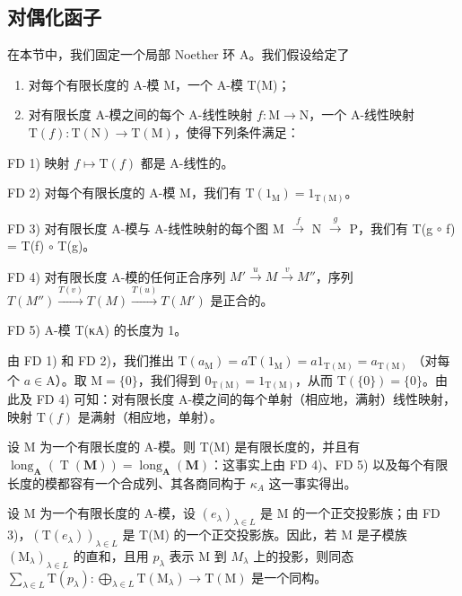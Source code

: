 \subsection{对偶化函子}

在本节中，我们固定一个局部 Noether 环 A。我们假设给定了

\begin{enumerate}
\def\labelenumi{\alph{enumi})}
\item
  对每个有限长度的 A-模 M，一个 A-模 T(M)；
\item
  对有限长度 A-模之间的每个 A-线性映射 \(f: \mathrm{M} \to \mathrm{N}\)，一个 A-线性映射 \(\mathrm{T}(f): \mathrm{T}(\mathrm{N}) \to \mathrm{T}(\mathrm{M})\)，使得下列条件满足：
\end{enumerate}

FD 1) 映射 \(f \mapsto \mathrm{T}(f)\) 都是 A-线性的。

FD 2) 对每个有限长度的 A-模 M，我们有 \(\mathrm{T}(1_{\mathrm{M}}) = 1_{\mathrm{T(M)}}\)。

FD 3) 对有限长度 A-模与 A-线性映射的每个图 M \(\xrightarrow{f}\) N \(\xrightarrow{g}\) P，我们有 T(g \(\circ\) f) = T(f) \(\circ\) T(g)。

FD 4) 对有限长度 A-模的任何正合序列 \(M' \xrightarrow{u} M \xrightarrow{v} M''\)，序列 \(T(M'') \xrightarrow{T(v)} T(M) \xrightarrow{T(u)} T(M')\) 是正合的。

FD 5) A-模 T(κA) 的长度为 1。

由 FD 1) 和 FD 2)，我们推出 \(\mathrm{T}(a_{\mathrm{M}}) = a\mathrm{T}(1_{\mathrm{M}}) = a1_{\mathrm{T(M)}} = a_{\mathrm{T(M)}}\) （对每个 \(a \in \mathrm{A}\)）。取 \(\mathrm{M} = \{0\}\)，我们得到 \(0_{\mathrm{T(M)}} = 1_{\mathrm{T(M)}}\)，从而 \(\mathrm{T}(\{0\}) = \{0\}\)。由此及 FD 4) 可知：对有限长度 A-模之间的每个单射（相应地，满射）线性映射，映射 \(\mathrm{T}(f)\) 是满射（相应地，单射）。

设 M 为一个有限长度的 A-模。则 T(M) 是有限长度的，并且有 \(\operatorname{long}_{\mathbf{A}}(\operatorname{T}(\mathbf{M})) = \operatorname{long}_{\mathbf{A}}(\mathbf{M})\)：这事实上由 FD 4)、FD 5) 以及每个有限长度的模都容有一个合成列、其各商同构于 \(\kappa_{A}\) 这一事实得出。

设 M 为一个有限长度的 A-模，设 \((e_{\lambda})_{\lambda \in L}\) 是 M 的一个正交投影族；由 FD 3)，\((\mathrm{T}(e_{\lambda}))_{\lambda \in L}\) 是 T(M) 的一个正交投影族。因此，若 M 是子模族 \((\mathrm{M}_{\lambda})_{\lambda \in L}\) 的直和，且用 \(p_{\lambda}\) 表示 M 到 \(M_{\lambda}\) 上的投影，则同态 \(\sum_{\lambda \in L} \mathrm{T}(p_{\lambda}) : \bigoplus_{\lambda \in L} \mathrm{T}(\mathrm{M}_{\lambda}) \longrightarrow \mathrm{T}(\mathrm{M})\) 是一个同构。

